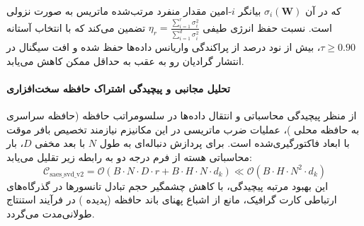 که در آن $\sigma_i(\mathbf{W})$ بیانگر $i$-امین مقدار منفرد مرتب‌شده ماتریس به صورت نزولی است. نسبت حفظ انرژی طیفی $\eta_r = \frac{\sum_{i=1}^r \sigma_i^2}{\sum_{i=1}^{d} \sigma_i^2}$ تضمین می‌کند که با انتخاب آستانه $\tau \ge 0.90$، بیش از نود درصد از پراکندگی واریانس داده‌ها حفظ شده و افت سیگنال در انتشار گرادیان رو به عقب به حداقل ممکن کاهش می‌یابد.

\paragraph{تحلیل مجانبی و پیچیدگی اشتراک حافظه سخت‌افزاری}
از منظر پیچیدگی محاسباتی و انتقال داده‌ها در سلسومراتب حافظه (حافظه سراسری  به حافظه محلی )، عملیات ضرب ماتریسی در این مکانیزم نیازمند تخصیص بافر موقت با ابعاد فاکتورگیری‌شده است. برای پردازش دنباله‌ای به طول $N$ با بعد مخفی $D$، بار محاسباتی هسته از فرم درجه دو به رابطه زیر تقلیل می‌یابد:
\begin{equation}
\label{eq:complexity_saes_svd_v2}
\mathcal{C}_{\text{saes\_svd\_v2}} = \mathcal{O}\left( B \cdot N \cdot D \cdot r + B \cdot H \cdot N \cdot d_k \right) \ll \mathcal{O}\left( B \cdot H \cdot N^2 \cdot d_k \right)
\end{equation}
این بهبود مرتبه پیچیدگی، با کاهش چشمگیر حجم تبادل تانسورها در گذرگاه‌های ارتباطی کارت گرافیک، مانع از اشباع پهنای باند حافظه (پدیده ) در فرآیند استنتاج طولانی‌مدت می‌گردد.
